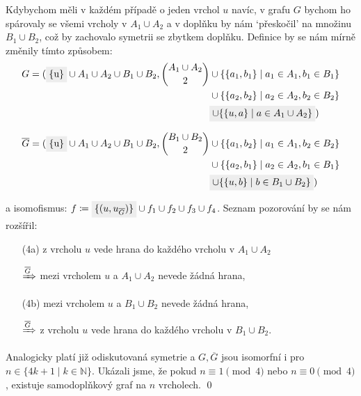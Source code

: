 \documentclass{article}
\newcommand{\mathcolorbox}[2]{\colorbox{#1}{$\displaystyle #2$}}
\begin{document}
Kdybychom měli v každém případě o jeden vrchol $u$ navíc, v grafu $G$ bychom ho spárovaly se všemi vrcholy v $A_1 \cup A_2$ a v doplňku by nám `přeskočil' na množinu $B_1 \cup B_2$, což by zachovalo symetrii se zbytkem doplňku. Definice by se nám mírně změnily tímto způsobem:
\begin{align*}
    G = ( \colorbox{grey}{\{u\}} \cup A_1 \cup A_2 \cup B_1 \cup B_2, \binom{A_1 \cup A_2}{2}
     & \cup \{ \{a_1, b_1\} \mid a_1 \in A_1, b_1 \in B_1 \}               \\
     & \cup \{ \{a_2, b_2\} \mid a_2 \in A_2, b_2 \in B_2 \}               \\
     & \mathcolorbox{grey}{ \cup \{ \{u, a\} \mid a \in A_1 \cup A_2 \} })
\end{align*}

\begin{align*}
    \overline{G} = ( \colorbox{grey}{\{u\}} \cup A_1 \cup A_2 \cup B_1 \cup B_2, \binom{B_1 \cup B_2}{2}
     & \cup \{ \{a_1, b_2\} \mid a_1 \in A_1, b_2 \in B_2 \}             \\
     & \cup \{ \{a_2, b_1\} \mid a_2 \in A_2, b_1 \in B_1 \}             \\
     & \mathcolorbox{grey}{\cup \{ \{u, b\} \mid b \in B_1 \cup B_2 \}})
\end{align*}

a isomofismus: $f \coloneqq \mathcolorbox{grey}{\{(u, u_{\overline{G}})\}} \cup f_1 \cup f_2 \cup f_3 \cup f_4$. Seznam pozorování by se nám rozšířil:
\begin{itemize}[parsep=0pt, itemsep=0pt]
    \item[(4a)] z vrcholu $u$ vede hrana do každého vrcholu v $A_1 \cup A_2$
    \item[$\xRightarrow{\overline{G}}$] mezi vrcholem $u$ a $A_{1} \cup A_{2}$ nevede žádná hrana,
    \item[(4b)] mezi vrcholem $u$ a $B_1 \cup B_2$ nevede žádná hrana,
    \item[$\xRightarrow{\overline{G}}$] z vrcholu $u$ vede hrana do každého vrcholu v $B_{1} \cup B_{2}$.
\end{itemize}

Analogicky platí již odiskutovaná symetrie a $G, \overline{G}$ jsou isomorfní i pro $n \in \{ 4k + 1 \mid k \in \mathbb{N} \}$.
Ukázali jsme, že pokud $n \equiv 1 \pmod{4}$ nebo $n \equiv 0 \pmod{4}$, existuje samodoplňkový graf na $n$ vrcholech.
\qed
\end{document}
